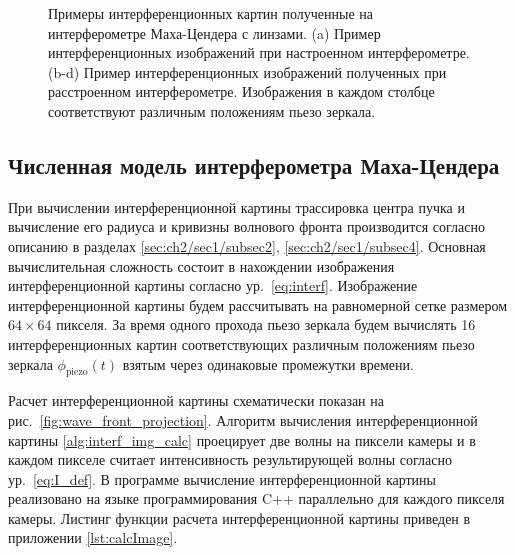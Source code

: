 \begin{figure}[ht]
\caption{Примеры интерференционных картин полученные на интерферометре Маха-Цендера с линзами. (a) Пример интерференционных изображений при настроенном интерферометре. (b-d) Пример интерференционных изображений полученных при расстроенном интерферометре. Изображения в каждом столбце соответствуют различным положениям пьезо зеркала.}
\label{fig:visib_lens_expl}
\end{figure}

\subsection{Численная модель интерферометра Маха-Цендера}\label{sec:ch2/sec1/subsec6}

При вычислении интерференционной картины трассировка центра пучка и вычисление его радиуса и кривизны волнового фронта производится согласно описанию в разделах \ref{sec:ch2/sec1/subsec2}, \ref{sec:ch2/sec1/subsec4}. Основная вычислительная сложность состоит в нахождении изображения интерференционной картины согласно ур.~\eqref{eq:interf}. Изображение интерференционной картины будем рассчитывать на равномерной сетке размером $64\times64$ пикселя. За время одного прохода пьезо зеркала будем вычислять 16 интерференционных картин соответствующих различным положениям пьезо зеркала $\phi_{\mathrm{piezo}}(t)$ взятым через одинаковые промежутки времени. 

Расчет интерференционной картины схематически показан на рис.~\ref{fig:wave_front_projection}. Алгоритм вычисления интерференционной картины \ref{alg:interf_img_calc} проецирует две волны на пиксели камеры и в каждом пикселе считает интенсивность результирующей волны согласно ур.~\eqref{eq:I_def}. В программе вычисление интерференционной картины реализовано на языке программирования C++ параллельно для каждого пикселя камеры. Листинг функции расчета интерференционной картины приведен в приложении \ref{lst:calcImage}. 

